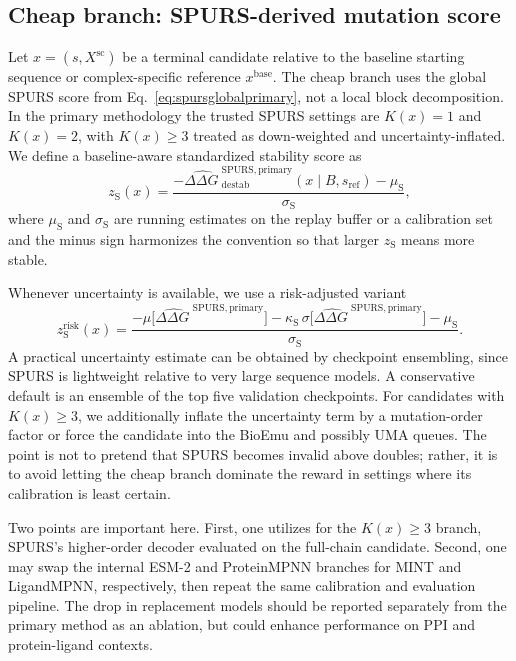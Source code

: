 \documentclass[11pt]{article}
\newcommand{\ddG}{\ensuremath{\Delta\Delta G \ }}
\begin{document}
\subsection{Cheap branch: SPURS-derived mutation score}

Let $x=(s,X^{\mathrm{sc}})$ be a terminal candidate relative to the baseline starting sequence or complex-specific reference $x^{\mathrm{base}}$. The cheap branch uses the global SPURS score from Eq.~\eqref{eq:spursglobalprimary}, not a local block decomposition. In the primary methodology the trusted SPURS settings are $K(x)=1$ and $K(x)=2$, with $K(x)\ge 3$ treated as down-weighted and uncertainty-inflated. We define a baseline-aware standardized stability score as
\begin{equation}
    z_{\mathrm S}(x)=\frac{-\widehat{\ddG}^{\mathrm{SPURS,primary}}_{\mathrm{destab}}(x\mid B,s_{\mathrm{ref}})-\mu_{\mathrm S}}{\sigma_{\mathrm S}},
\end{equation}
where $\mu_{\mathrm S}$ and $\sigma_{\mathrm S}$ are running estimates on the replay buffer or a calibration set and the minus sign harmonizes the convention so that larger $z_{\mathrm S}$ means more stable.

Whenever uncertainty is available, we use a risk-adjusted variant
\begin{equation}
    z_{\mathrm S}^{\mathrm{risk}}(x)=\frac{-\mu\big[\widehat{\ddG}^{\mathrm{SPURS,primary}}\big]-\kappa_{\mathrm S}\,\sigma\big[\widehat{\ddG}^{\mathrm{SPURS,primary}}\big]-\mu_{\mathrm S}}{\sigma_{\mathrm S}}.
\end{equation}
A practical uncertainty estimate can be obtained by checkpoint ensembling, since SPURS is lightweight relative to very large sequence models. A conservative default is an ensemble of the top five validation checkpoints. For candidates with $K(x)\ge 3$, we additionally inflate the uncertainty term by a mutation-order factor or force the candidate into the BioEmu and possibly UMA queues. The point is not to pretend that SPURS becomes invalid above doubles; rather, it is to avoid letting the cheap branch dominate the reward in settings where its calibration is least certain.

Two points are important here. First, one utilizes for the $K(x)\ge 3$ branch, SPURS's higher-order decoder evaluated on the full-chain candidate. Second, one may swap the internal ESM-2 and ProteinMPNN branches for MINT and LigandMPNN, respectively, then repeat the same calibration and evaluation pipeline. The drop in replacement models should be reported separately from the primary method as an ablation, but could enhance performance on PPI and protein-ligand contexts. 
\end{document}
